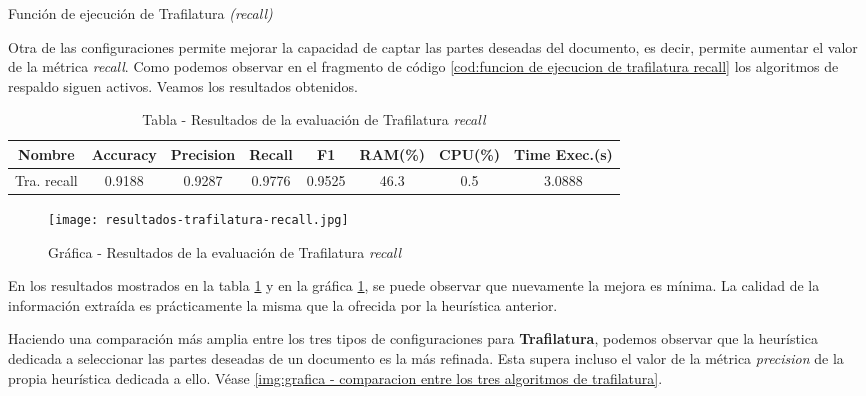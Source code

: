 \begin{codefloat}
    
    \caption{Función de ejecución de Trafilatura \emph{(recall)}}
    \label{cod:funcion de ejecucion de trafilatura recall}
\end{codefloat}

Otra de las configuraciones permite mejorar la capacidad de captar las partes deseadas del documento, es
decir, permite aumentar el valor de la métrica \emph{recall}. Como podemos observar en el fragmento de
código \ref{cod:funcion de ejecucion de trafilatura recall} los algoritmos de respaldo siguen activos. 
Veamos los resultados obtenidos.

\begin{table}[h]
    \begin{center}
      \begin{tabular}{| c | c | c | c | c | c | c | c |} \hline 
       \textbf{Nombre} & \textbf{Accuracy} & \textbf{Precision}  & \textbf{Recall} & \textbf{F1} & \textbf{RAM(\%)} & \textbf{CPU(\%)} & \textbf{Time Exec.(s)} \\ \hline
       Tra. recall & 0.9188 & 0.9287 & 0.9776 & 0.9525 & 46.3 & 0.5 & 3.0888 \\ \hline
      \end{tabular}
      \caption{Tabla - Resultados de la evaluación de Trafilatura \emph{recall}}
      \label{tab:tabla - resultados de la evaluacion de trafilatura recall}
    \end{center}
\end{table}

\begin{figure}[tphb]
    \centering
    \texttt{[image: resultados-trafilatura-recall.jpg]}
    \caption{Gráfica - Resultados de la evaluación de Trafilatura \emph{recall}}
    \label{img:grafica - resultados de la evaluacion de trafilatura recall}
\end{figure}

En los resultados mostrados en la tabla \ref{tab:tabla - resultados de la evaluacion de trafilatura recall}
y en la gráfica \ref{img:grafica - resultados de la evaluacion de trafilatura recall}, se puede observar
que nuevamente la mejora es mínima. La calidad de la información extraída es prácticamente la misma que la
ofrecida por la heurística anterior.

Haciendo una comparación más amplia entre los tres tipos de configuraciones para \textbf{Trafilatura},
podemos observar que la heurística dedicada a seleccionar las partes deseadas de un documento es la más
refinada. Esta supera incluso el valor de la métrica \emph{precision} de la propia heurística dedicada a 
ello. Véase \ref{img:grafica - comparacion entre los tres algoritmos de trafilatura}.

